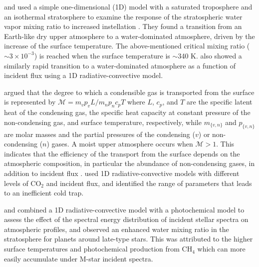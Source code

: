 \documentclass[11pt,numberedappendix,twocolappendix,]{emulateapj}
\def\wv{water vapor}
\def\revise#1{{\bf #1}}
\begin{document}
\citet{Kasting1993} and \citet{Kopparapu2013} used a simple one-dimensional (1D) model with a saturated troposphere and an isothermal stratosphere to examine the response of the stratospheric \wv{} mixing ratio to increased instellation \revise{\citep[see also][]{Kasting2015}}. 
They found a transition from an Earth-like dry upper atmosphere to a water-dominated atmosphere, driven by the increase of the surface temperature. 
The above-mentioned critical mixing ratio ($\sim 3 \times 10^{-3}$) is reached when the surface temperature is $\sim $340 K. 
\citet{Kodama2015} also showed a similarly rapid transition to a water-dominated atmosphere as a function of incident flux using a 1D radiative-convective model.  

\citet{Wordsworth2013,Wordsworth2014} argued that the degree to which a condensible gas is transported from the surface is represented by $\mathcal{M} = m_v p_v L / m_n p_n c_p T $ where $L$, $c_p$, and $T$ are the specific latent heat of the condensing gas, the specific heat capacity at constant pressure of the non-condensing gas, and surface  temperature, respectively, while $m_{\{v,n\}}$ and $p_{\{v,n\}}$ are molar masses and the partial pressures of the  condensing ($v$) or non-condensing ($n$) gases. 
A moist upper atmosphere occurs when $\mathcal{M} > 1$. 
This indicates that the efficiency of the transport from the surface depends on the atmospheric composition, in particular the abundance of non-condensing gases, in addition to incident flux \citep{Wordsworth2014}. 
\citet{Wordsworth2013} used 1D radiative-convective models with different levels of CO$_2$ and incident flux, and identified the range of parameters that leads to an inefficient cold trap. 

\citet{Rauer2011} and \citet{Rugheimer2013,Rugheimer2015} combined a 1D radiative-convective model with a photochemical model to assess the effect of the spectral energy distribution of incident stellar spectra on atmospheric profiles, and observed an enhanced water mixing ratio in the stratosphere for planets around late-type stars. This was attributed to the higher surface temperatures and photochemical production from CH$_4$ which can more easily accumulate under M-star incident spectra. 
\end{document}
